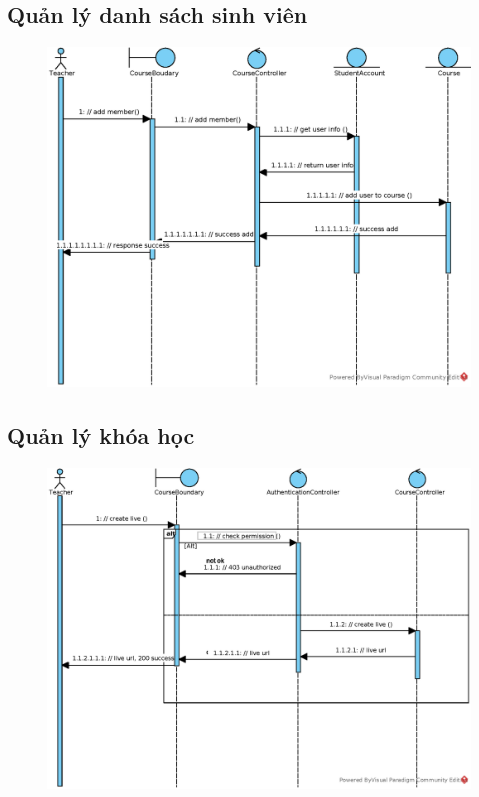 \documentclass[./../main_file.tex]{subfiles}
\begin{document}
	\subsection{Quản lý danh sách sinh viên}
	\begin{figure}[H]
		\centering
		\includegraphics[width=\linewidth]{./images/sequence_diagram/3_14_add_member_to_course.eps}	
	\end{figure}
	
	
	\subsection{Quản lý khóa học}
	\begin{figure}[H]
		\centering
		\includegraphics[width=\linewidth]{./images/sequence_diagram/3_15_Create_live_session.eps}
	\end{figure}
	
\end{document}
